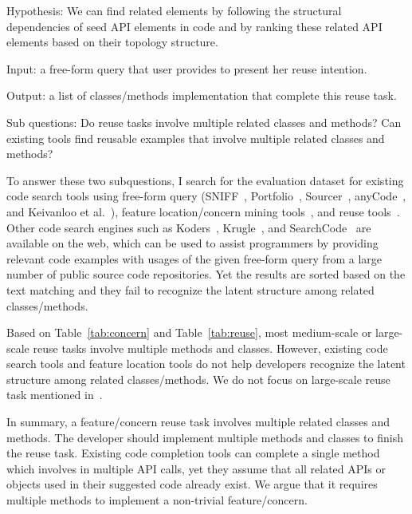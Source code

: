Hypothesis: We can find related elements by following the structural dependencies of seed API elements in code and by ranking these related API elements based on their topology structure. 

Input: a free-form query that user provides to present her reuse intention.

Output: a list of classes/methods implementation that complete this reuse task.

Sub questions: Do reuse tasks involve multiple related classes and methods? Can existing tools find reusable examples that involve multiple related classes and methods?

To answer these two subquestions, I search for the evaluation dataset for existing code search tools using free-form query (SNIFF~\cite{sniff:Sen09}, Portfolio~\cite{Portfolio:DenysICSE11}, Sourcer~\cite{Sourcerer:SC14}, anyCode~\cite{Gvero:ICSE15}, and Keivanloo et al.~\cite{spotWork:ICSE14}), feature location/concern mining tools~\cite{Denys:FCA12, Hill:FindConcept07, Hassan:concernHistory10, Breu:DynamicAspect04},   and reuse tools~\cite{Holmes:reuse07, Holmes:ASE09}. Other code search engines such as Koders~\cite{Koders}, Krugle~\cite{Krugle}, and SearchCode~\cite{SearchCode} are available on the web, which can be used to assist programmers by providing relevant code examples with usages of the given free-form query from a large number of public source code repositories. Yet the results are sorted based on the text matching and they fail to recognize the latent structure among related classes/methods. 

Based on Table~\ref{tab:concern} and Table~\ref{tab:reuse}, most medium-scale or large-scale reuse tasks involve multiple methods and classes.  However, existing code search tools and  feature location tools  do not help developers recognize the latent structure among related classes/methods. We do not focus on large-scale reuse task mentioned in~\cite{Holmes:reuse07, Holmes:ASE09}. 




In summary,  a feature/concern reuse task involves multiple related classes and methods. The developer should implement multiple methods and classes to finish the reuse task. Existing  code completion tools can complete a single method which involves in multiple API calls, yet they assume that all related APIs or  objects used in their suggested code already exist. We argue that it requires multiple methods to implement a non-trivial feature/concern. 

